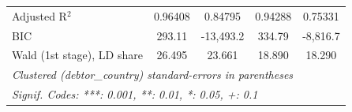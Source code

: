 \begin{table}[htbp]
\begin{tabular}{lcccc}
      Adjusted R$^2$                           & 0.96408                        & 0.84795                        & 0.94288                           & 0.75331\\  
      BIC                                      & 293.11                         & -13,493.2                      & 334.79                            & -8,816.7\\  
      Wald (1st stage), LD share               & 26.495                         & 23.661                         & 18.890                            & 18.290\\  
      \midrule \midrule
      \multicolumn{5}{l}{\emph{Clustered (debtor\_country) standard-errors in parentheses}}\\
      \multicolumn{5}{l}{\emph{Signif. Codes: ***: 0.001, **: 0.01, *: 0.05, +: 0.1}}\\
   \end{tabular}
\end{table}


